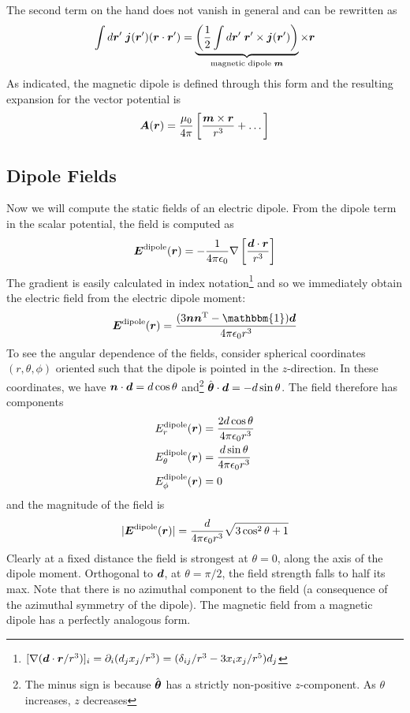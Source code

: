 \documentclass[twocolumn]{gwclass}
\begin{document}
	The second term on the hand does not vanish in general and can be rewritten as
	$$ \int d\boldsymbol{r}'\;\boldsymbol{j}(\boldsymbol{r}')(\boldsymbol{r}\cdot\boldsymbol{r}')= \underbrace{\left(\frac{1}{2}\int d\boldsymbol{r}'\;\boldsymbol{r}'\times\boldsymbol{j}(\boldsymbol{r}')\right)}_{\text{\normalfont{magnetic dipole }} \boldsymbol{m} } \times\boldsymbol{r} $$
	As indicated, the magnetic dipole is defined through this form and the resulting expansion for the vector potential is
	$$ \boldsymbol{A}(\boldsymbol{r}) = \frac{\mu_0}{4\pi}\left[\frac{\boldsymbol{m}\times \boldsymbol{r}}{r^3} + \dots\right] $$
	
	\subsection{Dipole Fields}
	Now we will compute the static fields of an electric dipole. From the dipole term in the scalar potential, the field is computed as
	$$ \boldsymbol{E}^{\text{\normalfont{dipole}}}(\boldsymbol{r}) = -\frac{1}{4\pi\epsilon_0}\nabla\left[\frac{\boldsymbol{d}\cdot\boldsymbol{r}}{r^3}\right] $$ 
	The gradient is easily calculated in index notation\footnote{$[\nabla(\boldsymbol{d}\cdot\boldsymbol{r}/r^3)]_i=\partial_i(d_jx_j/r^3)= (\delta_{ij}/r^3 - 3x_ix_j/r^5)d_j$} and so we immediately obtain the electric field from the electric dipole moment:
	$$ \*E^\t{dipole}(\*r) = \frac{(3\*n\*n^\t{T} - \mathbbm{1})\*d}{4\pi\epsilon_0 r^3} $$
	To see the angular dependence of the fields, consider spherical coordinates $(r,\theta,\phi)$ oriented such that the dipole is pointed in the $z$-direction. In these coordinates, we have $\boldsymbol{n}\cdot\boldsymbol{d} = d\cos\theta$ and\footnote{The minus sign is because $\hat{\boldsymbol{\theta}}$ has a strictly non-positive $z$-component. As $\theta$ increases, $z$ decreases} $\hat{\boldsymbol{\theta}}\cdot\boldsymbol{d} = -d\sin\theta$. The field therefore has components
	\begin{align*}  
		E^{\text{\normalfont{dipole}}}_r(\boldsymbol{r}) &= \frac{2d\cos\theta}{4\pi\epsilon_0 r^3}  \\
		E^{\text{\normalfont{dipole}}}_\theta(\boldsymbol{r}) &= \frac{d\sin\theta}{4\pi\epsilon_0 r^3} \\
		E^{\text{\normalfont{dipole}}}_\phi(\boldsymbol{r}) &= 0
	\end{align*}
	and the magnitude of the field is
	$$ |\boldsymbol{E}^{\text{\normalfont{dipole}}}(\boldsymbol{r})| = \frac{d}{4\pi\epsilon_0 r^3}\sqrt{3\cos^2\theta + 1} $$
	Clearly at a fixed distance the field is strongest at $\theta=0$, along the axis of the dipole moment. Orthogonal to $\boldsymbol{d}$, at $\theta=\pi/2$, the field strength falls to half its max. Note that there is no azimuthal component to the field (a consequence of the azimuthal symmetry of the dipole). 
	The magnetic field from a magnetic dipole has a perfectly analogous form. 
	
\end{document}
